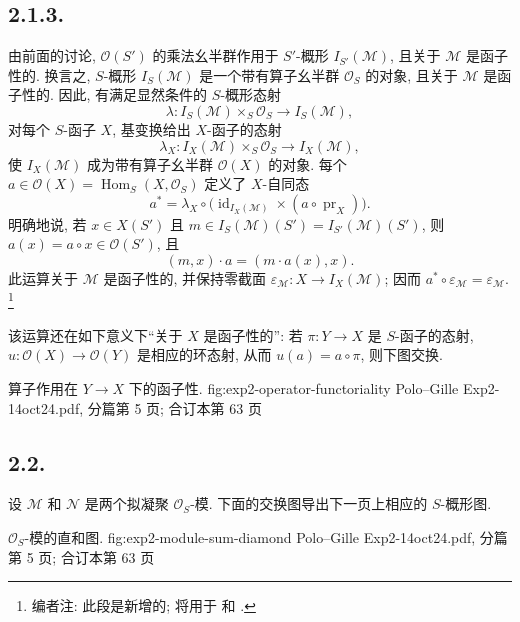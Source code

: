 \subsection*{2.1.3.}
由前面的讨论, \(\mathcal O(S')\) 的乘法幺半群作用于
\(S'\)-概形 \(I_{S'}(\mathcal M)\), 且关于 \(\mathcal M\) 是函子性的.
换言之, \(S\)-概形 \(I_S(\mathcal M)\) 是一个带有算子幺半群
\(\mathcal O_S\) 的对象, 且关于 \(\mathcal M\) 是函子性的.
因此, 有满足显然条件的 \(S\)-概形态射
\[
  \lambda:I_S(\mathcal M)\times_S\mathcal O_S
  \longrightarrow I_S(\mathcal M),
\]
对每个 \(S\)-函子 \(X\), 基变换给出 \(X\)-函子的态射
\[
  \lambda_X:I_X(\mathcal M)\times_S\mathcal O_S
  \longrightarrow I_X(\mathcal M),
\]
使 \(I_X(\mathcal M)\) 成为带有算子幺半群
\(\mathcal O(X)\) 的对象. 每个
\(a\in\mathcal O(X)=\operatorname{Hom}_S(X,\mathcal O_S)\) 定义了
\(X\)-自同态
\[
  a^*=\lambda_X\circ
  \bigl(\operatorname{id}_{I_X(\mathcal M)}\times(a\circ\operatorname{pr}_X)\bigr).
\]
明确地说, 若 \(x\in X(S')\) 且
\(m\in I_S(\mathcal M)(S')=I_{S'}(\mathcal M)(S')\), 则
\(a(x)=a\circ x\in\mathcal O(S')\), 且
\[
  (m,x)\cdot a=(m\cdot a(x),x).
\]
此运算关于 \(\mathcal M\) 是函子性的, 并保持零截面
\(\varepsilon_{\mathcal M}:X\to I_X(\mathcal M)\); 因而
\(a^*\circ\varepsilon_{\mathcal M}=\varepsilon_{\mathcal M}\).
\footnote{编者注: 此段是新增的; 将用于
 和 .}

该运算还在如下意义下``关于 \(X\) 是函子性的'': 若
\(\pi:Y\to X\) 是 \(S\)-函子的态射,
\(u:\mathcal O(X)\to\mathcal O(Y)\) 是相应的环态射,
从而 \(u(a)=a\circ\pi\), 则下图交换.

  {算子作用在 \(Y\to X\) 下的函子性.}
  {fig:exp2-operator-functoriality}
  {Polo--Gille Exp2-14oct24.pdf, 分篇第 5 页; 合订本第 63 页}

\subsection*{2.2.}
设 \(\mathcal M\) 和 \(\mathcal N\) 是两个拟凝聚
\(\mathcal O_S\)-模. 下面的交换图导出下一页上相应的 \(S\)-概形图.

  {\(\mathcal O_S\)-模的直和图.}
  {fig:exp2-module-sum-diamond}
  {Polo--Gille Exp2-14oct24.pdf, 分篇第 5 页; 合订本第 63 页}

